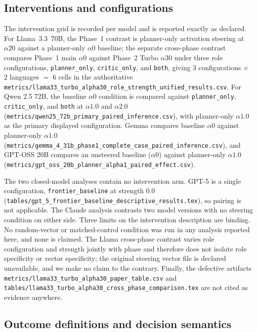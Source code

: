 \subsection{Interventions and configurations}

The intervention grid is recorded per model and is reported exactly as declared.
For Llama~3.3~70B, the Phase~1 contrast is planner-only activation steering at
$\alpha20$ against a planner-only $\alpha0$ baseline; the separate cross-phase
contrast compares Phase~1 main $\alpha0$ against Phase~2 Turbo $\alpha30$ under
three role configurations, \texttt{planner\_only}, \texttt{critic\_only}, and
\texttt{both}, giving 3 configurations $\times$ 2 languages $=$ 6 cells in the
authoritative
\texttt{metrics/llama33\_turbo\_alpha30\_role\_strength\_unified\_results.csv}.
For Qwen 2.5 72B, the baseline $\alpha0$ condition is compared against
\texttt{planner\_only}, \texttt{critic\_only}, and \texttt{both} at $\alpha1.0$
and $\alpha2.0$ (\texttt{metrics/qwen25\_72b\_primary\_paired\_inference.csv}),
with planner-only $\alpha1.0$ as the primary displayed configuration. Gemma
compares baseline $\alpha0$ against planner-only $\alpha1.0$
(\texttt{metrics/gemma\_4\_31b\_phase1\_complete\_case\_paired\_inference.csv}),
and GPT-OSS 20B compares an unsteered baseline ($\alpha0$) against planner-only
$\alpha1.0$
(\texttt{metrics/gpt\_oss\_20b\_planner\_alpha1\_paired\_effect.csv}).

The two closed-model analyses contain no intervention arm. GPT-5 is a single
configuration, \texttt{frontier\_baseline} at strength 0.0
(\texttt{tables/gpt\_5\_frontier\_baseline\_descriptive\_results.tex}), so
pairing is not applicable. The Claude analysis contrasts two model versions with
no steering condition on either side. Three limits on the intervention
description are binding. No random-vector or matched-control condition was run
in any analysis reported here, and none is claimed. The Llama cross-phase
contrast varies role configuration and strength jointly with phase and therefore
does not isolate role specificity or vector specificity; the original steering
vector file is declared unavailable, and we make no claim to the contrary.
Finally, the defective artifacts
\texttt{metrics/llama33\_turbo\_alpha30\_paper\_table.csv} and
\texttt{tables/llama33\_turbo\_alpha30\_cross\_phase\_comparison.tex} are not
cited as evidence anywhere.

\subsection{Outcome definitions and decision semantics}

